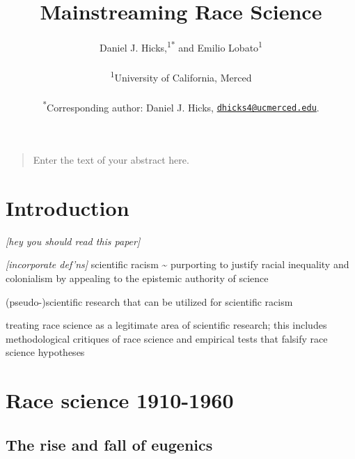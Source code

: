 \documentclass[12pt]{article}
\title{\bf Mainstreaming Race Science}
\author{
Daniel J. Hicks,\textsuperscript{1}\textsuperscript{*}
and Emilio Lobato\textsuperscript{1}
\\
\\
\normalsize{\textsuperscript{1}University of California, Merced}\\
\\
\textsuperscript{*}Corresponding author: Daniel J. Hicks,
\href{mailto:dhicks4@ucmerced.edu}{\nolinkurl{dhicks4@ucmerced.edu}}.
}
\date{}
\providecommand{\tightlist}{%
  \setlength{\itemsep}{0pt}\setlength{\parskip}{0pt}}
\newenvironment{sciabstract}{%
\begin{quote} \singlespacing}
{\end{quote}}
\begin{document}

\baselineskip24pt


\maketitle


\begin{sciabstract}
Enter the text of your abstract here.
\end{sciabstract}

\hypertarget{introduction}{%
\section*{Introduction}\label{introduction}}

\emph{{[}hey you should read this paper{]}}

\emph{{[}incorporate def'ns{]}} scientific racism \textasciitilde{}
purporting to justify racial inequality and colonialism by appealing to
the epistemic authority of science

\begin{description}
\tightlist
\item[race science]
(pseudo-)scientific research that can be utilized for scientific racism
\item[race science discourse]
treating race science as a legitimate area of scientific research; this
includes methodological critiques of race science and empirical tests
that falsify race science hypotheses
\end{description}

\hypertarget{race-science-1910-1960}{%
\section*{Race science 1910-1960}\label{race-science-1910-1960}}

\hypertarget{the-rise-and-fall-of-eugenics}{%
\subsection*{The rise and fall of
eugenics}\label{the-rise-and-fall-of-eugenics}}
\end{document}
